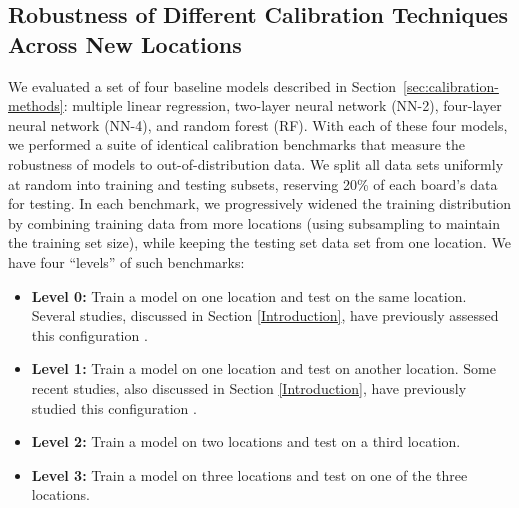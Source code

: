 \documentclass[journal abbreviation, manuscript]{copernicus}
\begin{document}
\subsection{Robustness of Different Calibration Techniques Across New Locations}
We evaluated a set of four baseline models described in Section~\ref{sec:calibration-methods}: multiple linear regression, two-layer neural network (NN-2), four-layer neural network (NN-4), and random forest (RF). With each of these four models, we performed a suite of identical calibration benchmarks that measure the robustness of models to out-of-distribution data. We split all data sets uniformly at random into training and testing subsets, reserving 20\% of each board's data for testing.  In each benchmark, we progressively widened the training distribution by combining training data from more locations (using subsampling to maintain the training set size), while keeping the testing set data set from one location.  We have four ``levels'' of such benchmarks:
\begin{itemize}
    \item \textbf{Level 0:} Train a model on one location and test on the same location.  Several studies, discussed in Section \ref{Introduction}, have previously assessed this configuration \citep{Zimmerman2018,Spinelle2015,SPINELLE2017706,Cross2017}.
    \item \textbf{Level 1:} Train a model on one location and test on another location.  Some recent studies, also discussed in Section \ref{Introduction}, have previously studied this configuration \citep{Hagan2018, Casey2018testing, Bigi2018performance, Malings2018Development}.
    \item \textbf{Level 2:} Train a model on two locations and test on a third location.
    \item \textbf{Level 3:} Train a model on three locations and test on one of the three locations.
\end{itemize}
\end{document}
